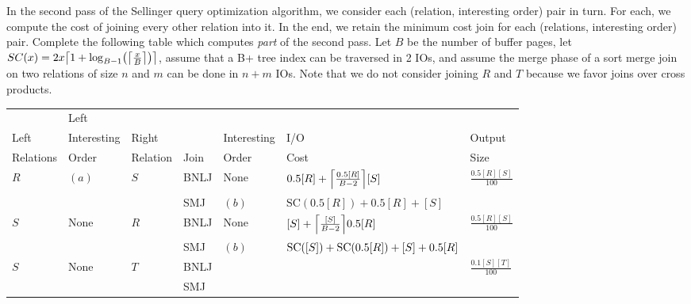 \documentclass{article}
\newcommand{\sol}[1]{\iftoggle{showsolutions}{\textcolor{red}{#1}}{\phantom{#1}}}
\begin{document}
In the second pass of the Sellinger query optimization algorithm, we consider
each (relation, interesting order) pair in turn. For each, we compute the cost
of joining every other relation into it. In the end, we retain the minimum cost
join for each (relations, interesting order) pair. Complete the following table
which computes \emph{part} of the second pass. Let $B$ be the number of buffer
pages, let $SC(x) = \sortcost{x}$, assume that a B+ tree index can be traversed
in 2 IOs, and assume the merge phase of a sort merge join on two relations of
size $n$ and $m$ can be done in $n + m$ IOs. Note that we do not consider
joining $R$ and $T$ because we favor joins over cross products.
\begin{center}
  \begin{tabular}{|l|l|l|l|l|l|l|}
    \hline
                         & Left                   &                      &      &                &                                       & \\
    Left                 & Interesting            & Right                &      & Interesting    & I/O                                   & Output                                   \\
    Relations            & Order                  & Relation             & Join & Order          & Cost                                  & Size                                     \\\hline
    \multirow{2}{*}{$R$} & \multirow{2}{*}{$(a)$} & \multirow{2}{*}{$S$} & BNLJ & None           & $\bnlj{0.5[R]}{[S]}$                  & \multirow{2}{*}{$\frac{0.5[R][S]}{100}$} \\\cline{4-6}
                         &                        &                      & SMJ  & $(b)$          & $\text{SC}(0.5[R]) + 0.5[R] + [S]$    & \\\hline
    \multirow{2}{*}{$S$} & \multirow{2}{*}{None}  & \multirow{2}{*}{$R$} & BNLJ & None           & $\bnlj{[S]}{0.5[R]}$                  & \multirow{2}{*}{$\frac{0.5[R][S]}{100}$} \\\cline{4-6}
                         &                        &                      & SMJ  & $(b)$          & $\text{SC}([S]) + \text{SC}(0.5[R]) + [S] + 0.5[R]$                   & \\\hline
    \multirow{2}{*}{$S$} & \multirow{2}{*}{None}  & \multirow{2}{*}{$T$} & BNLJ & \sol{None}     & \sol{$\bnlj{[S]}{0.1[T]}$}            & \multirow{2}{*}{$\frac{0.1[S][T]}{100}$} \\\cline{4-6}
                         &                        &                      & SMJ  & \sol{$(c)$}    & \sol{$\text{SC}([S]) + [S] + 0.1[T]$} & \\\hline

\end{tabular}
\end{center}
\end{document}
